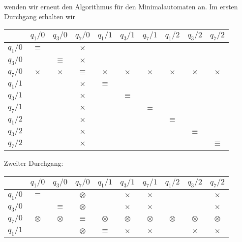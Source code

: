 \begin{loesung}
\begin{teilaufgaben}
wenden wir erneut den Algorithmus für den Minimalautomaten an. Im
ersten Durchgang erhalten wir
\begin{center}
\begin{tabular}{|c|ccccccccc|}
\hline
         &$q_1/0$  &$q_3/0$  &$q_7/0$  &$q_1/1$  &$q_3/1$  &$q_7/1$  &$q_1/2$  &$q_3/2$  &$q_7/2$  \\
\hline
$q_1/0$  &$\equiv$ &         &$\times$ &         &         &         &         &         &         \\
$q_3/0$  &         &$\equiv$ &$\times$ &         &         &         &         &         &         \\
$q_7/0$  &$\times$ &$\times$ &$\equiv$ &$\times$ &$\times$ &$\times$ &$\times$ &$\times$ &$\times$ \\
$q_1/1$  &         &         &$\times$ &$\equiv$ &         &         &         &         &         \\
$q_3/1$  &         &         &$\times$ &         &$\equiv$ &         &         &         &         \\
$q_7/1$  &         &         &$\times$ &         &         &$\equiv$ &         &         &         \\
$q_1/2$  &         &         &$\times$ &         &         &         &$\equiv$ &         &         \\
$q_3/2$  &         &         &$\times$ &         &         &         &         &$\equiv$ &         \\
$q_7/2$  &         &         &$\times$ &         &         &         &         &         &$\equiv$ \\
\hline
\end{tabular}
\end{center}
Zweiter Durchgang:
\begin{center}
\begin{tabular}{|c|ccccccccc|}
\hline
         &$q_1/0$  &$q_3/0$  &$q_7/0$  &$q_1/1$  &$q_3/1$  &$q_7/1$  &$q_1/2$  &$q_3/2$  &$q_7/2$  \\
\hline
$q_1/0$  &$\equiv$ &         &$\otimes$&         &$\times$ &$\times$ &         &         &$\times$ \\
$q_3/0$  &         &$\equiv$ &$\otimes$&         &$\times$ &$\times$ &         &         &$\times$ \\
$q_7/0$  &$\otimes$&$\otimes$&$\equiv$ &$\otimes$&$\otimes$&$\otimes$&$\otimes$&$\otimes$&$\otimes$\\
$q_1/1$  &         &         &$\otimes$&$\equiv$ &$\times$ &$\times$ &         &$\times$ &$\times$ \\

\end{tabular}
\end{center}
\end{teilaufgaben}
\end{loesung}
